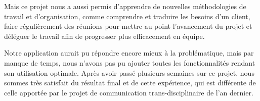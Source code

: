 Mais ce projet nous a aussi permis d'apprendre de nouvelles méthodologies de travail et d'organisation, comme comprendre et traduire les besoins d'un client, faire régulièrement des réunions pour mettre au point l'avancement du projet et déléguer le travail afin de progresser plus efficacement en équipe.\newline


Notre application aurait pu répondre encore mieux à la problématique, mais par manque de temps, nous n'avons pas pu ajouter toutes les fonctionnalités rendant son utilisation optimale.
Après avoir passé plusieurs semaines sur ce projet, nous sommes très satisfait du résultat final et de cette expérience, qui est différente de celle apportée par le projet de communication trans-disciplinaire de l'an dernier.\newline



